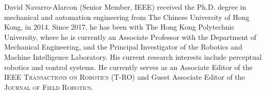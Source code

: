 \documentclass[journal,twoside]{IEEEtran}
\begin{document}
\begin{IEEEbiography}
 {David Navarro-Alarcon} (Senior Member, IEEE) received the Ph.D. degree in mechanical and automation engineering from The Chinese University of Hong Kong, in 2014. 
Since 2017, he has been with The Hong Kong Polytechnic University, where he is currently an Associate Professor with the Department of Mechanical Engineering, and the Principal Investigator of the Robotics and Machine Intelligence Laboratory.
His current research interests include perceptual robotics and control systems.
He currently serves as an Associate Editor of the \textsc{IEEE Transactions on Robotics (T-RO)} and Guest Associate Editor of the \textsc{Journal of Field Robotics}.
\end{IEEEbiography}
\end{document}
